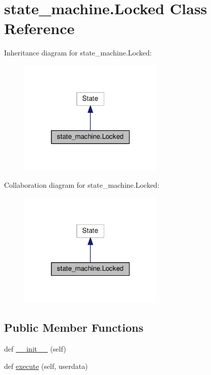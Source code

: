 \hypertarget{classstate__machine_1_1Locked}{}\section{state\+\_\+machine.\+Locked Class Reference}
\label{classstate__machine_1_1Locked}


Inheritance diagram for state\+\_\+machine.\+Locked\+:\nopagebreak
\begin{figure}[H]
\begin{center}
\leavevmode
\includegraphics[width=195pt]{classstate__machine_1_1Locked__inherit__graph}
\end{center}
\end{figure}


Collaboration diagram for state\+\_\+machine.\+Locked\+:\nopagebreak
\begin{figure}[H]
\begin{center}
\leavevmode
\includegraphics[width=195pt]{classstate__machine_1_1Locked__coll__graph}
\end{center}
\end{figure}
\subsection*{Public Member Functions}
\begin{DoxyCompactItemize}
\item 
def \hyperlink{classstate__machine_1_1Locked_a9b4ed5583dd109a846e88c4ee296dd6a}{\+\_\+\+\_\+init\+\_\+\+\_\+} (self)
\item 
def \hyperlink{classstate__machine_1_1Locked_a9a53fcb4569ca96d6f72d256b112ad5b}{execute} (self, userdata)
\end{DoxyCompactItemize}

